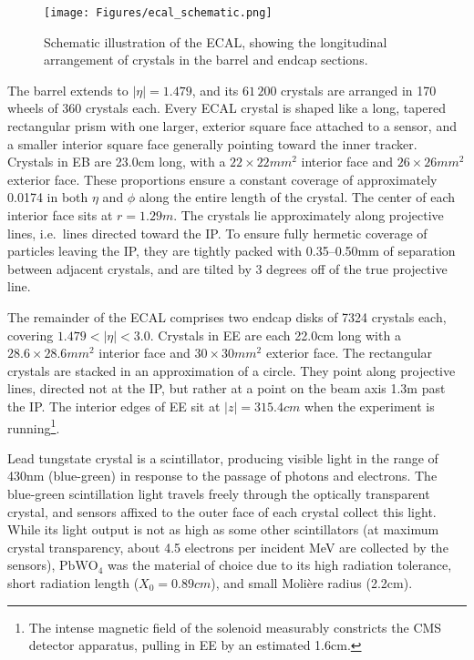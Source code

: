\begin{figure}[hbtp]
  \begin{center}
    \texttt{[image: Figures/ecal\_schematic.png]}
    \caption{Schematic illustration of the ECAL, showing the longitudinal arrangement of crystals in the barrel and endcap sections.}
    \label{fig:ecal_schematic}
  \end{center}
\end{figure}

The barrel extends to $|\eta| = 1.479$,
and its $61\,200$ crystals are arranged in 170 wheels of 360 crystals each. Every ECAL crystal is shaped like a long, tapered rectangular prism with one
larger, exterior square face attached to a sensor, and a smaller interior square face generally pointing toward the inner tracker. Crystals in EB
are 23.0\unit{cm} long, with a $22{\times}22\unit{mm^2}$ interior face and $26{\times}26\unit{mm^2}$ exterior face. These proportions ensure
a constant coverage of approximately 0.0174 in both $\eta$ and $\phi$ along the entire length of the crystal. The center of each interior face sits at $r = 1.29\unit{m}$.
The crystals lie approximately along projective lines, i.e.\ lines directed toward the IP. To ensure fully hermetic coverage of particles leaving the IP,
they are tightly packed with 0.35--0.50\unit{mm} of separation between adjacent crystals, and are tilted by 3 degrees off of the true projective line.

The remainder of the ECAL comprises two endcap disks of 7324 crystals each, covering $1.479 < |\eta| < 3.0$.
Crystals in EE are each 22.0\unit{cm} long with a $28.6{\times}28.6\unit{mm^2}$ interior face and $30{\times}30\unit{mm^2}$ exterior face.
The rectangular crystals are stacked in an approximation of a circle. They point along projective lines, directed not at the IP, but rather at a point on
the beam axis 1.3\unit{m} past the IP. The interior edges of EE sit at $|z| = 315.4\unit{cm}$ when the experiment is running\footnote{The intense magnetic
field of the solenoid measurably constricts the CMS detector apparatus, pulling in EE by an estimated 1.6\unit{cm}.}.

Lead tungstate crystal is a scintillator, producing visible
light in the range of 430\unit{nm} (blue-green) in response to the passage of photons and electrons. The blue-green scintillation light travels freely through
the optically transparent crystal, and sensors affixed to the outer face of each crystal collect this light. While its light output is not as high as some other
scintillators (at maximum crystal transparency, about 4.5 electrons per incident MeV are collected by the sensors), $\mathrm{PbWO}_{4}$ was the material of choice
due to its high radiation tolerance, short radiation length ($X_{0} = 0.89\unit{cm}$), and small Molière radius (2.2\unit{cm}).

